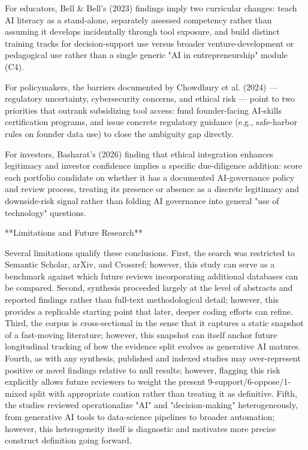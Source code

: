 \documentclass[11pt, a4paper]{article}
\begin{document}
For educators, Bell & Bell's (2023) findings imply two curricular changes: teach AI literacy as a stand-alone, separately assessed competency rather than assuming it develops incidentally through tool exposure, and build distinct training tracks for decision-support use versus broader venture-development or pedagogical use rather than a single generic "AI in entrepreneurship" module (C4).

For policymakers, the barriers documented by Chowdhury et al. (2024) — regulatory uncertainty, cybersecurity concerns, and ethical risk — point to two priorities that outrank subsidizing tool access: fund founder-facing AI-skills certification programs, and issue concrete regulatory guidance (e.g., safe-harbor rules on founder data use) to close the ambiguity gap directly.

For investors, Basharat's (2026) finding that ethical integration enhances legitimacy and investor confidence implies a specific due-diligence addition: score each portfolio candidate on whether it has a documented AI-governance policy and review process, treating its presence or absence as a discrete legitimacy and downside-risk signal rather than folding AI governance into general "use of technology" questions.

**Limitations and Future Research**

Several limitations qualify these conclusions. First, the search was restricted to Semantic Scholar, arXiv, and Crossref; however, this study can serve as a benchmark against which future reviews incorporating additional databases can be compared. Second, synthesis proceeded largely at the level of abstracts and reported findings rather than full-text methodological detail; however, this provides a replicable starting point that later, deeper coding efforts can refine. Third, the corpus is cross-sectional in the sense that it captures a static snapshot of a fast-moving literature; however, this snapshot can itself anchor future longitudinal tracking of how the evidence split evolves as generative AI matures. Fourth, as with any synthesis, published and indexed studies may over-represent positive or novel findings relative to null results; however, flagging this risk explicitly allows future reviewers to weight the present 9-support/6-oppose/1-mixed split with appropriate caution rather than treating it as definitive. Fifth, the studies reviewed operationalize "AI" and "decision-making" heterogeneously, from generative AI tools to data-science pipelines to broader automation; however, this heterogeneity itself is diagnostic and motivates more precise construct definition going forward.
\end{document}

